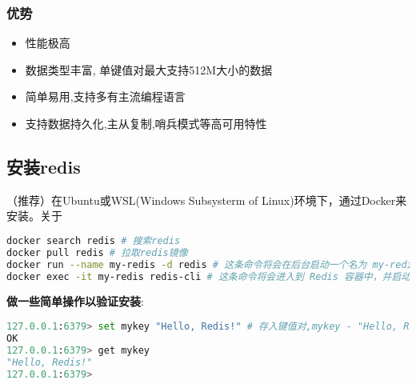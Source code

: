 \subsubsection{优势}
\begin{itemize}
\item 性能极高
\item 数据类型丰富, 单键值对最大支持512M大小的数据
\item 简单易用,支持多有主流编程语言
\item 支持数据持久化,主从复制,哨兵模式等高可用特性
\end{itemize}

\subsection{安装redis}
（推荐）在Ubuntu或WSL(Windows Subsysterm of Linux)环境下，通过Docker来安装。关于
\begin{lstlisting}[language=bash]
docker search redis # 搜索redis
docker pull redis # 拉取redis镜像
docker run --name my-redis -d redis # 这条命令将会在后台启动一个名为 my-redis 的 Redis 容器。
docker exec -it my-redis redis-cli # 这条命令将会进入到 Redis 容器中，并启动 Redis 命令行客户端。
\end{lstlisting}

\textbf{做一些简单操作以验证安装}:
\begin{lstlisting}[language=python]
127.0.0.1:6379> set mykey "Hello, Redis!" # 存入键值对,mykey - "Hello, Redis!"
OK
127.0.0.1:6379> get mykey
"Hello, Redis!"
127.0.0.1:6379>
\end{lstlisting}
